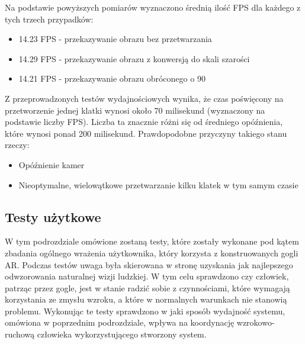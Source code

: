 \documentclass[a4paper,11pt,twoside]{report}
\theoremstyle{definition}
\begin{document}
\begin{description}
Na podstawie powyższych pomiarów wyznaczono średnią ilość FPS dla każdego z tych trzech przypadków:

\begin{itemize}
\item 14.23 FPS - przekazywanie obrazu bez przetwarzania 
\item 14.29 FPS - przekazywanie obrazu z konwersją do skali szarości
\item 14.21 FPS - przekazywanie obrazu obróconego o 90\textdegree
\end{itemize}

\end{description}

Z przeprowadzonych testów wydajnościowych wynika, że czas poświęcony na przetworzenie jednej klatki wynosi około 70 milisekund (wyznaczony na podstawie liczby FPS). Liczba ta znacznie różni się od średniego opóźnienia, które wynosi ponad 200 milisekund. Prawdopodobne przyczyny takiego stanu rzeczy:
\begin{itemize}
\item Opóźnienie kamer
\item Nieoptymalne, wielowątkowe przetwarzanie kilku klatek w tym samym czasie
\end{itemize}

\subsection{Testy użytkowe}

W tym podrozdziale omówione zostaną testy, które zostały wykonane pod kątem zbadania ogólnego wrażenia użytkownika, który korzysta z konstruowanych gogli AR. Podczas testów uwaga była skierowana w stronę uzyskania jak najlepszego odwzorowania naturalnej wizji ludzkiej. W tym celu sprawdzono czy człowiek, patrząc przez gogle, jest w stanie radzić sobie z czynnościami, które wymagają korzystania ze zmysłu wzroku, a które w normalnych warunkach nie stanowią problemu. Wykonując te testy sprawdzono w jaki sposób wydajność systemu, omówiona w poprzednim podrozdziale, wpływa na koordynację wzrokowo-ruchową człowieka wykorzystującego stworzony system.
\end{document}
